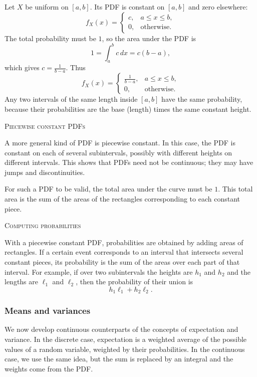 Let \(X\) be uniform on \([a,b]\).  
Its PDF is constant on \([a,b]\) and zero elsewhere:
\[
f_X(x) =
\begin{cases}
c, & a \le x \le b, \\
0, & \text{otherwise}.
\end{cases}
\]
The total probability must be \(1\), so the area under the PDF is
\[
1 = \int_a^b c \, dx = c(b-a),
\]
which gives \(c = \frac{1}{b-a}\).  
Thus
\[
f_X(x) =
\begin{cases}
\frac{1}{b-a}, & a \le x \le b, \\
0, & \text{otherwise}.
\end{cases}
\]
Any two intervals of the same length inside \([a,b]\) have the same probability, because their probabilities are the base (length) times the same constant height.

\bigskip\textsc{Piecewise constant PDFs}

A more general kind of PDF is piecewise constant.  
In this case, the PDF is constant on each of several subintervals, possibly with different heights on different intervals.  
This shows that PDFs need not be continuous; they may have jumps and discontinuities.

For such a PDF to be valid, the total area under the curve must be \(1\).  
This total area is the sum of the areas of the rectangles corresponding to each constant piece.

\bigskip\textsc{Computing probabilities}

With a piecewise constant PDF, probabilities are obtained by adding areas of rectangles.  
If a certain event corresponds to an interval that intersects several constant pieces, its probability is the sum of the areas over each part of that interval.  
For example, if over two subintervals the heights are \(h_1\) and \(h_2\) and the lengths are \(\ell_1\) and \(\ell_2\), then the probability of their union is
\[
h_1 \ell_1 + h_2 \ell_2.
\]


\subsubsection{Means and variances}

We now develop continuous counterparts of the concepts of expectation and variance.  
In the discrete case, expectation is a weighted average of the possible values of a random variable, weighted by their probabilities.  
In the continuous case, we use the same idea, but the sum is replaced by an integral and the weights come from the PDF.

